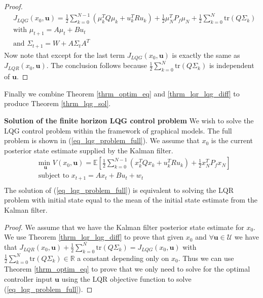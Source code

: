 \begin{proof}
\begin{equation}
\begin{aligned}
&J_{LQG}(x_0, \mathbf{u}) = \frac{1}{2}\sum_{k=0}^{N-1} \left( \mu_k^TQ\mu_k + u_k^TRu_k \right) + \frac{1}{2}\mu_N^TP_f\mu_N + \frac{1}{2}\sum_{k=0}^N \text{tr}(Q\Sigma_k) \\
&\text{with } \mu_{t+1} = A\mu_t +Bu_t \\
&\text{and } \Sigma_{t+1} = W+A\Sigma_t A^T 
\end{aligned}
\label{eq_simpl_obj_func}
\end{equation}
Now note that except for the last term $J_{LQG}(x_0, \mathbf{u})$ is exactly the same as $J_{LQR}(x_0, \mathbf{u})$. The conclusion follows because $\frac{1}{2}\sum_{k=0}^N \text{tr}(Q\Sigma_k)$ is independent of $\mathbf{u}$. 
\end{proof}
Finally we combine Theorem \ref{thrm_optim_eq} and \ref{thrm_lqr_lqg_diff} to produce Theorem \ref{thrm_lqg_sol}.
\begin{thrm}
\textbf{Solution of the finite horizon LQG control problem} We wish to solve the LQG control problem within the framework of graphical models. The full problem is shown in (\ref{eq_lqg_problem_full}). We assume that $x_0$ is the current posterior state estimate supplied by the Kalman filter.
\begin{equation}
\begin{aligned}
&\underset{\mathbf{u}}{\text{min }} V(x_0, \mathbf{u}) = \mathbb{E}\left[ \frac{1}{2}\sum_{k=0}^{N-1} \left( x_k^TQx_k + u_k^TRu_k \right) + \frac{1}{2}x_N^TP_fx_N \right] \\
& \text{subject to } x_{t+1}=Ax_t+Bu_t + w_t\\
\end{aligned}
\label{eq_lqg_problem_full}
\end{equation}
The solution of (\ref{eq_lqg_problem_full}) is equivalent to solving the LQR problem with initial state equal to the mean of the initial state estimate from the Kalman filter.
\label{thrm_lqg_sol}
\end{thrm}
\begin{proof}
We assume that we have the Kalman filter posterior state estimate for $x_0$. We use Theorem \ref{thrm_lqr_lqg_diff} to prove that given $x_0$ and $\forall \mathbf{u} \in \mathcal{U}$ we have that $J_{LQR}(x_0, \mathbf{u}) + \frac{1}{2}\sum_{k=0}^N \text{tr}(Q\Sigma_k) = J_{LQG}(x_0, \mathbf{u})$ with $\frac{1}{2}\sum_{k=0}^N \text{tr}(Q\Sigma_k) \in \mathbb{R}$ a constant depending only on $x_0$. Thus we can use Theorem \ref{thrm_optim_eq} to prove that we only need to solve for the optimal controller input $\mathbf{u}$ using the LQR objective function to solve (\ref{eq_lqg_problem_full}). 
\end{proof}

